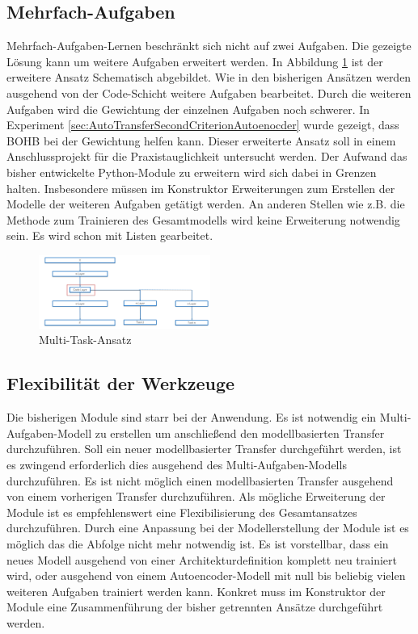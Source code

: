 	\subsection{Mehrfach-Aufgaben}
	\label{subsec:MehrfacheAufgaben}
	Mehrfach-Aufgaben-Lernen beschränkt sich nicht auf zwei Aufgaben. Die gezeigte Lösung kann um weitere Aufgaben erweitert werden. In Abbildung \ref{img:AusblickMultiTaskAnsatz} ist der erweitere Ansatz Schematisch abgebildet. Wie in den bisherigen Ansätzen werden ausgehend von der Code-Schicht weitere Aufgaben bearbeitet. Durch die weiteren Aufgaben wird die Gewichtung der einzelnen Aufgaben noch schwerer. In Experiment \ref{sec:AutoTransferSecondCriterionAutoenocder}  wurde gezeigt, dass BOHB bei der Gewichtung helfen kann. Dieser erweiterte Ansatz soll in einem Anschlussprojekt für die Praxistauglichkeit untersucht werden. Der Aufwand das bisher entwickelte Python-Module zu erweitern wird sich dabei in Grenzen halten. Insbesondere müssen im Konstruktor Erweiterungen zum Erstellen der Modelle der weiteren Aufgaben getätigt werden. An anderen Stellen wie z.B. die Methode zum Trainieren des Gesamtmodells wird keine Erweiterung notwendig sein. Es wird schon mit Listen gearbeitet.   
	\begin{figure}[h]
		\centering
		\includegraphics[width=0.5\textwidth, center]{bilder/FazitUndAusblick/MultiTaskAnsatz.PNG}
		\caption[Ausblick Multi-Task-Ansatz]{Multi-Task-Ansatz}
		\label{img:AusblickMultiTaskAnsatz}
	\end{figure}


	\subsection{Flexibilität der Werkzeuge}
	\label{subsec:FlexibilitätDerWerkzeuge}
	Die bisherigen Module sind starr bei der Anwendung. Es ist notwendig ein Multi-Aufgaben-Modell zu erstellen um anschließend den modellbasierten Transfer durchzuführen. Soll ein neuer modellbasierter Transfer durchgeführt werden, ist es zwingend erforderlich dies ausgehend des Multi-Aufgaben-Modells durchzuführen. Es ist  nicht möglich einen modellbasierten Transfer ausgehend von einem vorherigen Transfer durchzuführen. 
	Als mögliche Erweiterung der Module ist es empfehlenswert eine Flexibilisierung des Gesamtansatzes durchzuführen. Durch eine Anpassung bei der Modellerstellung der Module ist es möglich das die Abfolge nicht mehr notwendig ist. Es ist vorstellbar, dass ein neues Modell ausgehend von einer Architekturdefinition komplett neu trainiert wird, oder ausgehend von einem Autoencoder-Modell mit null bis beliebig vielen weiteren Aufgaben trainiert werden kann. Konkret muss im Konstruktor der Module eine Zusammenführung der bisher getrennten Ansätze durchgeführt werden.     
